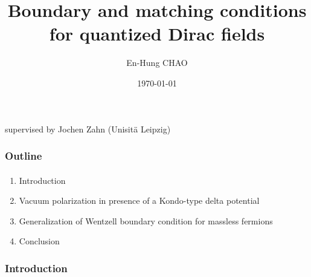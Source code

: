 \documentclass[english]{beamer}
\title{Boundary and matching conditions for quantized Dirac fields}
\author{En-Hung CHAO}
\institute{{\'E}cole Polytechnique \& Universit{\"a}t Leipzig}
\date{\today}
\begin{document}

\begin{frame}
\titlepage%
\centerline{supervised by Jochen Zahn (Unisit{\"a} Leipzig)}
\end{frame}
\begin{frame}
\frametitle{Outline}
\framesubtitle{}

\begin{enumerate}

\item Introduction
\item Vacuum polarization in presence of a Kondo-type delta potential
\item Generalization of Wentzell boundary condition for massless fermions
\item Conclusion

\end{enumerate}

\end{frame}
\begin{frame}
\frametitle{Introduction}
\framesubtitle{}


\end{frame}
\end{document}
